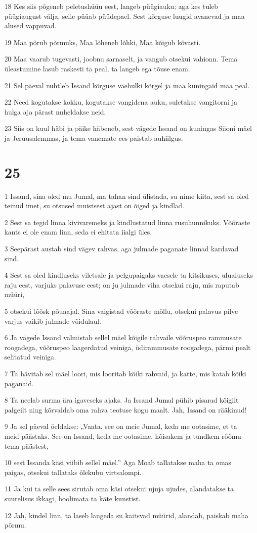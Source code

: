 \par 18 Kes siis põgeneb peletushüüu eest, langeb püügiauku; aga kes tuleb püügiaugust välja, selle püüab püüdepael. Sest kõrguse luugid avanevad ja maa alused vappuvad.
\par 19 Maa põrub põrmuks, Maa lõheneb lõhki, Maa kõigub kõvasti.
\par 20 Maa vaarub tugevasti, joobnu sarnaselt, ja vangub otsekui vahionn. Tema üleastumine lasub raskesti ta peal, ta langeb ega tõuse enam.
\par 21 Sel päeval nuhtleb Issand kõrguse väehulki kõrgel ja maa kuningaid maa peal.
\par 22 Need kogutakse kokku, kogutakse vangidena auku, suletakse vangitorni ja hulga aja pärast nuheldakse neid.
\par 23 Siis on kuul häbi ja päike häbeneb, sest vägede Issand on kuningas Siioni mäel ja Jeruusalemmas, ja tema vanemate ees paistab auhiilgus.

\chapter{25}

\par 1 Issand, sina oled mu Jumal, ma tahan sind ülistada, su nime kiita, sest sa oled teinud imet, su otsused muistsest ajast on õiged ja kindlad.
\par 2 Sest sa tegid linna kivivaremeks ja kindlustatud linna rusuhunnikuks. Võõraste kants ei ole enam linn, seda ei ehitata iialgi üles.
\par 3 Seepärast austab sind vägev rahvas, aga julmade paganate linnad kardavad sind.
\par 4 Sest sa oled kindluseks viletsale ja pelgupaigaks vaesele ta kitsikuses, ulualuseks raju eest, varjuks palavuse eest; on ju julmade viha otsekui raju, mis raputab müüri,
\par 5 otsekui lõõsk põuaajal. Sina vaigistad võõraste möllu, otsekui palavus pilve varjus vaikib julmade võidulaul.
\par 6 Ja vägede Issand valmistab sellel mäel kõigile rahvaile võõruspeo rammusate roogadega, võõruspeo laagerdatud veiniga, üdirammusate roogadega, pärmi pealt selitatud veiniga.
\par 7 Ta hävitab sel mäel loori, mis looritab kõiki rahvaid, ja katte, mis katab kõiki paganaid.
\par 8 Ta neelab surma ära igaveseks ajaks. Ja Issand Jumal pühib pisarad kõigilt palgeilt ning kõrvaldab oma rahva teotuse kogu maalt. Jah, Issand on rääkinud!
\par 9 Ja sel päeval öeldakse: „Vaata, see on meie Jumal, keda me ootasime, et ta meid päästaks. See on Issand, keda me ootasime, hõisakem ja tundkem rõõmu tema päästest,
\par 10 sest Issanda käsi viibib sellel mäel.” Aga Moab tallatakse maha ta omas paigas, otsekui tallataks õlekubu virtsalompi.
\par 11 Ja kui ta selle sees sirutab oma käsi otsekui ujuja ujudes, alandatakse ta suurelisus ikkagi, hoolimata ta käte kunstist.
\par 12 Jah, kindel linn, ta laseb langeda su kaitsvad müürid, alandab, paiskab maha põrmu.

